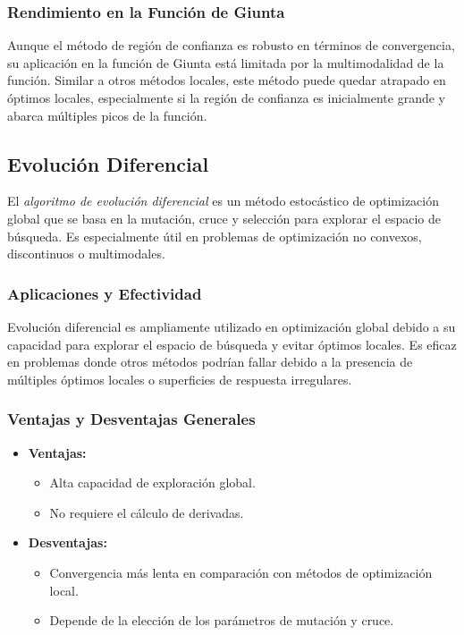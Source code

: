 \documentclass[fontsize=10pt]{article}
\begin{document}
\subsubsection{Rendimiento en la Función de Giunta}

Aunque el método de región de confianza es robusto en términos de convergencia, su aplicación en la función de Giunta está limitada por la multimodalidad de la función. Similar a otros métodos locales, este método puede quedar atrapado en óptimos locales, especialmente si la región de confianza es inicialmente grande y abarca múltiples picos de la función.

\subsection{Evolución Diferencial}

El \textit{algoritmo de evolución diferencial} es un método estocástico de optimización global que se basa en la mutación, cruce y selección para explorar el espacio de búsqueda. Es especialmente útil en problemas de optimización no convexos, discontinuos o multimodales.

\subsubsection{Aplicaciones y Efectividad}

Evolución diferencial es ampliamente utilizado en optimización global debido a su capacidad para explorar el espacio de búsqueda y evitar óptimos locales. Es eficaz en problemas donde otros métodos podrían fallar debido a la presencia de múltiples óptimos locales o superficies de respuesta irregulares.

\subsubsection{Ventajas y Desventajas Generales}

\begin{itemize}
    \item \textbf{Ventajas:} 
    \begin{itemize}
        \item Alta capacidad de exploración global.
        \item No requiere el cálculo de derivadas.
    \end{itemize}
    \item \textbf{Desventajas:} 
    \begin{itemize}
        \item Convergencia más lenta en comparación con métodos de optimización local.
        \item Depende de la elección de los parámetros de mutación y cruce.
    \end{itemize}
\end{itemize}
\end{document}
